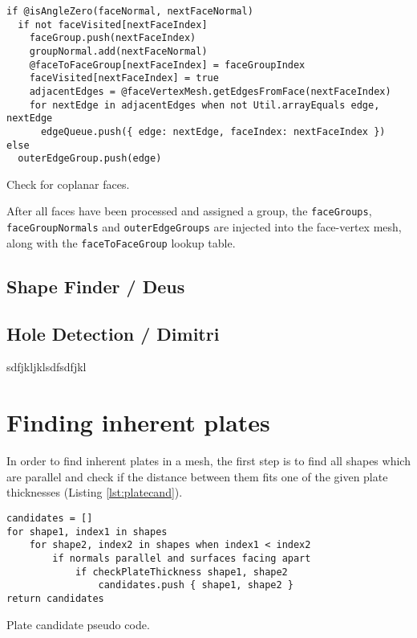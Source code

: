 \documentclass[../ClassicThesis.tex]{subfiles}
\begin{document}
\begin{listing}[ht]
\begin{verbatim}
if @isAngleZero(faceNormal, nextFaceNormal)
  if not faceVisited[nextFaceIndex]
    faceGroup.push(nextFaceIndex)
    groupNormal.add(nextFaceNormal)
    @faceToFaceGroup[nextFaceIndex] = faceGroupIndex
    faceVisited[nextFaceIndex] = true
    adjacentEdges = @faceVertexMesh.getEdgesFromFace(nextFaceIndex)
    for nextEdge in adjacentEdges when not Util.arrayEquals edge, nextEdge
      edgeQueue.push({ edge: nextEdge, faceIndex: nextFaceIndex })
else
  outerEdgeGroup.push(edge)
\end{verbatim}
\caption{Check for coplanar faces.}
\label{lst:coplanarcheck}
\end{listing}

After all faces have been processed and assigned a group, the \texttt{faceGroups}, \texttt{faceGroupNormals} and \texttt{outerEdgeGroups} are injected into the face-vertex mesh, along with the \texttt{faceToFaceGroup} lookup table.

\subsection{Shape Finder / Deus}



\subsection{Hole Detection / Dimitri}

sdfjkljklsdfsdfjkl

\section{Finding inherent plates}

In order to find inherent plates in a mesh, the first step is to find all shapes which are parallel and check if the distance between them fits one of the given plate thicknesses (Listing \ref{lst:platecand}).

\begin{listing}[ht]
\begin{verbatim}
candidates = []
for shape1, index1 in shapes
    for shape2, index2 in shapes when index1 < index2
        if normals parallel and surfaces facing apart
            if checkPlateThickness shape1, shape2
                candidates.push { shape1, shape2 }
return candidates
\end{verbatim}
\caption{Plate candidate pseudo code.}
\label{lst:platecand}
\end{listing}
\end{document}
